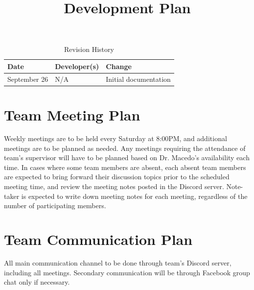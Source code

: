 \documentclass{article}
\title{Development Plan\\\progname}
\author{\authname}
\date{}
\begin{document}
\begin{table}[hp]
\caption{Revision History} \label{TblRevisionHistory}
\begin{tabularx}{\textwidth}{llX}
\toprule
\textbf{Date} & \textbf{Developer(s)} & \textbf{Change}\\
\midrule
September 26 & N/A & Initial documentation\\
\bottomrule
\end{tabularx}
\end{table}

\newpage

\maketitle


\section{Team Meeting Plan}
Weekly meetings are to be held every Saturday at 8:00PM, and additional meetings are to be planned as needed. Any meetings requiring the attendance of team's supervisor will have to be planned based on Dr. Macedo's availability each time. In cases where some team members are absent, each absent team members are expected to bring forward their discussion topics prior to the scheduled meeting time, and review the meeting notes posted in the Discord server. Note-taker is expected to write down meeting notes for each meeting, regardless of the number of participating members.\\

\section{Team Communication Plan}
All main communication channel to be done through team's Discord server, including all meetings. Secondary communication will be through Facebook group chat only if necessary.\\
\end{document}
